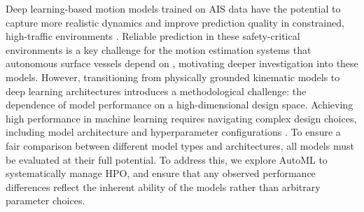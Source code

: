 Deep learning-based motion models trained on \ac{AIS} data have the potential to capture more realistic dynamics and improve prediction quality in constrained, high-traffic environments \parencite{donandt2022shortterm}. Reliable prediction in these safety-critical environments is a key challenge for the motion estimation systems that autonomous surface vessels depend on \parencite{TimEis2025}, %
motivating deeper investigation into these models. %
However, transitioning from physically grounded kinematic models to deep learning architectures 
introduces a methodological challenge: the dependence of model performance on a high-dimensional design space.
Achieving high performance in machine learning requires navigating complex design choices, including model architecture and hyperparameter configurations \parencite{AutoMLHoos}. 
To ensure a fair comparison between different model types and architectures, all models must be evaluated at their full potential. To address this, we explore \ac{AutoML} to systematically manage \ac{HPO}, and ensure that any observed performance differences reflect the inherent ability of the models rather than arbitrary parameter choices.


